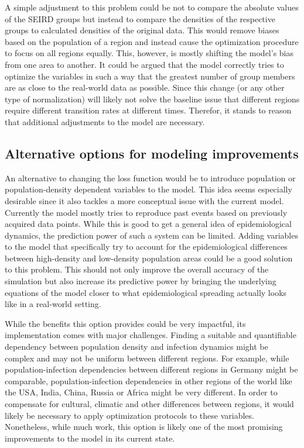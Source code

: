 A simple adjustment to this problem could be not to compare the absolute values of the SEIRD groups but instead to compare the
densities of the respective groups to calculated densities of the original data. This would remove biases based on the population
of a region and instead cause the optimization procedure to focus on all regions equally. This, however, is mostly shifting the model's
bias from one area to another. It could be argued that the model correctly tries to optimize the variables in such a way that the greatest
number of group members are as close to the real-world data as possible. Since this change (or any other type of normalization) will likely
not solve the baseline issue that different regions require different transition rates at different times. Therefor, it stands to reason that
additional adjustments to the model are necessary.

\subsection{Alternative options for modeling improvements}
An alternative to changing the loss function would be to introduce population or population-density dependent variables
to the model. This idea seems especially desirable since it also tackles a more conceptual issue with the current model. Currently 
the model mostly tries to reproduce past events based on previously acquired data points. While this is good to get a general
idea of epidemiological dynamics, the prediction power of such a system can be limited. Adding variables to the model
that specifically try to account for the epidemiological differences between high-density and low-density population areas could
be a good solution to this problem. This should not only improve the overall accuracy of the simulation but also increase its 
predictive power by bringing the underlying equations of the model closer to what epidemiological spreading actually looks like in a real-world setting.
\newline

While the benefits this option provides could be very impactful, its implementation comes with major challenges. Finding a suitable and quantifiable
dependency between population density and infection dynamics might be complex and may not be uniform between different
regions. For example, while population-infection dependencies between different regions in Germany might be comparable, population-infection
dependencies in other regions of the world like the USA, India, China, Russia or Africa might be very different. In order to compensate
for cultural, climatic and other differences between regions, it would likely be necessary to apply optimization protocols to these
variables. Nonetheless, while much work, this option is likely one of the most promising improvements to the model in its current state.\newline 

